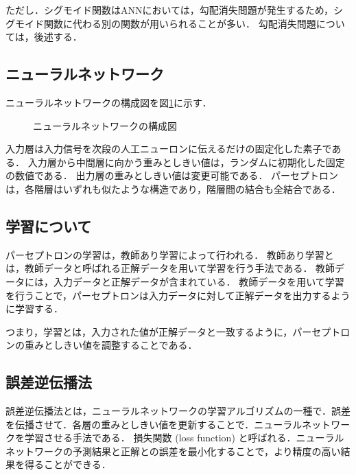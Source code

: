 \documentclass[a4j,12pt,dvipdfmx]{jreport}
\begin{document}
ただし．シグモイド関数はANNにおいては，勾配消失問題が発生するため，シグモイド関数に代わる別の関数が用いられることが多い．
勾配消失問題については，後述する．

\subsection{ニューラルネットワーク}
ニューラルネットワークの構成図を図\ref{fig:perceptron}に示す．

\begin{figure}[ht]
  \centering
  \caption{ニューラルネットワークの構成図}
  \label{fig:perceptron}
\end{figure}

入力層は入力信号を次段の人工ニューロンに伝えるだけの固定化した素子である．
入力層から中間層に向かう重みとしきい値は，ランダムに初期化した固定の数値である．
出力層の重みとしきい値は変更可能である．
パーセプトロンは，各階層はいずれも似たような構造であり，階層間の結合も全結合である．


\subsection{学習について}
パーセプトロンの学習は，教師あり学習によって行われる．
教師あり学習とは，教師データと呼ばれる正解データを用いて学習を行う手法である．
教師データには，入力データと正解データが含まれている．
教師データを用いて学習を行うことで，パーセプトロンは入力データに対して正解データを出力するように学習する．

つまり，学習とは，入力された値が正解データと一致するように，パーセプトロンの重みとしきい値を調整することである．

\subsection{誤差逆伝播法}
誤差逆伝播法とは，ニューラルネットワークの学習アルゴリズムの一種で．誤差を伝播させて．各層の重みとしきい値を更新することで．ニューラルネットワークを学習させる手法である．
損失関数 (loss function) と呼ばれる．ニューラルネットワークの予測結果と正解との誤差を最小化することで，より精度の高い結果を得ることができる．
\end{document}
